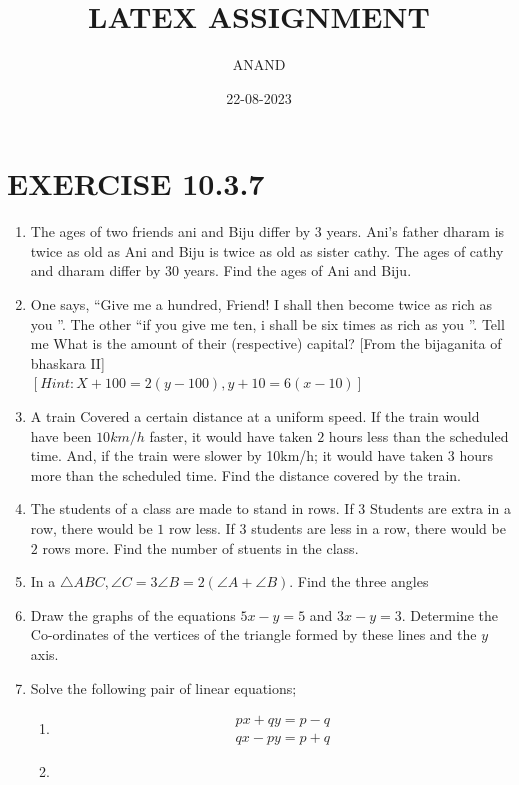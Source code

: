 \documentclass{article}
\theoremstyle{remark}
\begin{document}
\title{LATEX ASSIGNMENT}
\author{ANAND}
\date{22-08-2023}
\maketitle
\section*{EXERCISE 10.3.7}
\begin{enumerate}
\item The ages of two friends ani and Biju differ  by $3$  years. Ani's father dharam is twice as old as Ani and Biju is twice as old as sister cathy. The ages of cathy and dharam differ by $30$ years. Find the ages of Ani and Biju.
\item  One says, \textquotedblleft Give me a hundred, Friend!  I shall then become twice as rich as you \textquotedblright. The other \textquotedblleft  if you give me ten, i shall be six times as rich as you \textquotedblright.  Tell me What is the amount of their (respective) capital? [From the bijaganita of bhaskara II] 
\\ $[Hint: X+100=2(y-100), y+10=6(x-10)]$
\item A train Covered a certain distance at a uniform speed. If the train would have been $10km/h$ faster, it would have taken $2$ hours less than the scheduled time. And, if the train were slower by 10km/h; it would have taken $3$ hours more than the scheduled time. Find the distance covered by the train.
\item The students of a class are made to stand in rows. If 3 Students are extra in a row, there would be $1$ row less. If $3$ students are less in a row, there would be $2$ rows more. Find the number of stuents in the class.
\item In a $\triangle ABC, \angle C=3 \angle B=2(\angle A+\angle B)$. Find the three angles
\item Draw the graphs of the equations $5x-y=5$ and $3x-y=3$. Determine the Co-ordinates of the vertices of the triangle formed by these lines and the $y$ axis.
\item Solve the following pair of linear equations;
\begin{enumerate}
\item
\begin{align}
px+qy=p-q\\ qx-py=p+q
\end{align}
\item
\begin{align}                                                   

\end{align}
\end{enumerate}
\end{enumerate}
\end{document}

